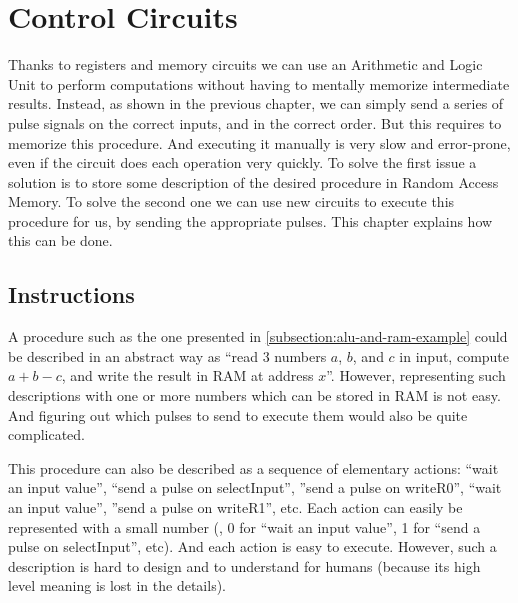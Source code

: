 
\renewcommand{\rustfile}{chapter4}
\setcounter{rustid}{0}

\chapter[Control Circuits]{Control Circuits}\label{chapter:control-circuits}

Thanks to registers and memory circuits we can use an Arithmetic and Logic Unit
to perform computations without having to mentally memorize intermediate
results. Instead, as shown in the previous chapter, we can simply send a series
of pulse signals on the correct inputs, and in the correct order. But this
requires to memorize this procedure. And executing it manually is very slow and
error-prone, even if the circuit does each operation very quickly. To solve the
first issue a solution is to store some description of the desired procedure in
Random Access Memory. To solve the second one we can use new circuits to
execute this procedure for us, by sending the appropriate pulses. This chapter
explains how this can be done.

\section{Instructions}

A procedure such as the one presented in \cref{subsection:alu-and-ram-example}
could be described in an abstract way as ``read 3 numbers $a$, $b$, and $c$ in
input, compute $a+b-c$, and write the result in RAM at address $x$''. However,
representing such descriptions with one or more numbers which can be stored in
RAM is not easy. And figuring out which pulses to send to execute them would
also be quite complicated.

This procedure can also be described as a sequence of elementary actions:
``wait an input value'', ``send a pulse on selectInput'', ''send a pulse on
writeR0'', ``wait an input value'', ''send a pulse on writeR1'', etc. Each
action can easily be represented with a small number (\eg, 0 for ``wait an
input value'', 1 for ``send a pulse on selectInput'', etc). And each action is
easy to execute. However, such a description is hard to design and to
understand for humans (because its high level meaning is lost in the details).

